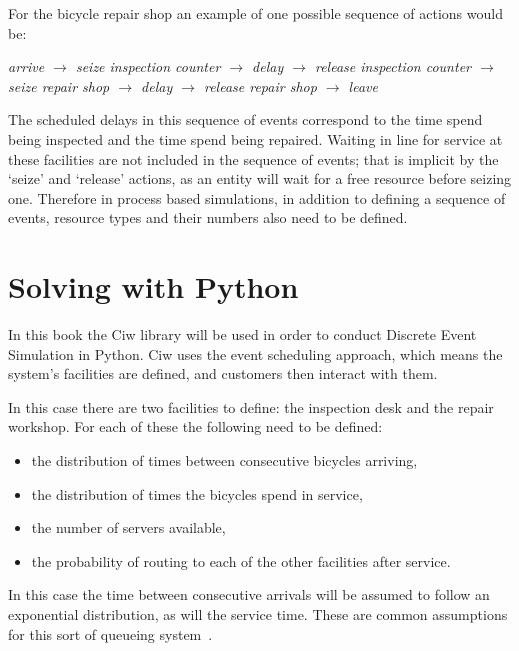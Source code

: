 For the bicycle repair shop an example of one possible sequence of actions would
be:

\textit{arrive
        \(\rightarrow\)
        seize inspection counter
        \(\rightarrow\)
        delay
        \(\rightarrow\)
        release inspection counter
        \(\rightarrow\)
        seize repair shop
        \(\rightarrow\)
        delay
        \(\rightarrow\)
        release repair shop
        \(\rightarrow\)
        leave
        }

The scheduled delays in this sequence of events correspond to the time spend
being inspected and the time spend being repaired. Waiting in line for service
at these facilities are not included in the sequence of events; that is implicit
by the `seize' and `release' actions, as an entity will wait for a free resource
before seizing one.
Therefore in process based simulations, in addition to defining a sequence of
events, resource types and their numbers also need to be defined.


\section{Solving with Python}\label{sec:discrete_event_simulation_solving-with-python}

In this book the Ciw library will be used in order to conduct Discrete Event
Simulation in Python.
Ciw uses the event scheduling approach, which means the system's
facilities are defined, and customers then interact with them.

In this case there are two facilities to define: the inspection desk and the
repair workshop. For each of these the following need to be defined:

\begin{itemize}
  \item the distribution of times between consecutive bicycles arriving,
  \item the distribution of times the bicycles spend in service,
  \item the number of servers available,
  \item the probability of routing to each of the other facilities after
  service.
\end{itemize}

In this case the time between consecutive arrivals will be assumed to follow an
exponential distribution, as will the service time.
These are common assumptions for this sort of queueing system~\autocite{stewart2009probability}.

